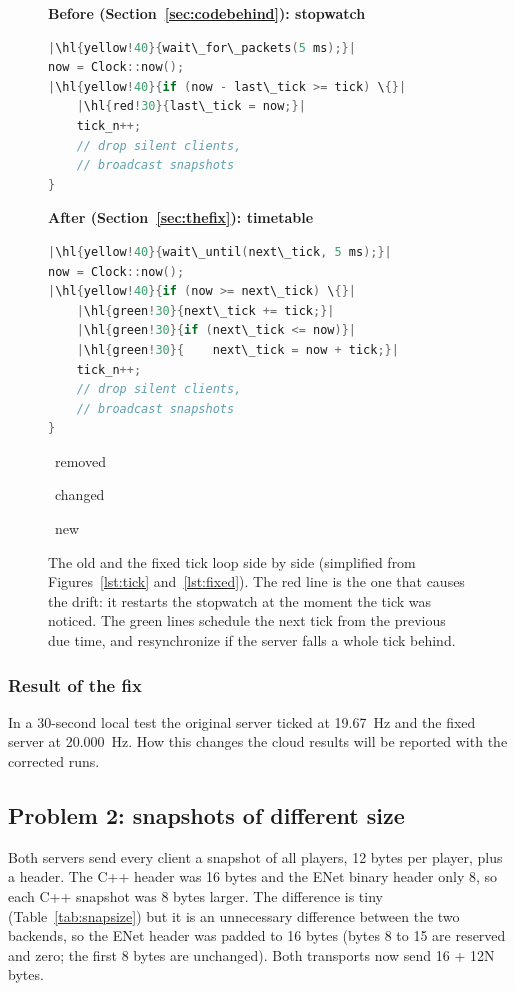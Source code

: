 \newcommand{\hl}[2]{\colorbox{#1}{\strut#2}}
\begin{figure}[H]
\centering
\begin{minipage}[t]{0.48\textwidth}
\textbf{\small Before (Section~\ref{sec:codebehind}): stopwatch}\par\smallskip
\begin{lstlisting}[language=C++,basicstyle=\ttfamily\scriptsize,escapechar=|,frame=none]
|\hl{yellow!40}{wait\_for\_packets(5 ms);}|
now = Clock::now();
|\hl{yellow!40}{if (now - last\_tick >= tick) \{}|
    |\hl{red!30}{last\_tick = now;}|
    tick_n++;
    // drop silent clients,
    // broadcast snapshots
}
\end{lstlisting}
\end{minipage}\hfill
\begin{minipage}[t]{0.48\textwidth}
\textbf{\small After (Section~\ref{sec:thefix}): timetable}\par\smallskip
\begin{lstlisting}[language=C++,basicstyle=\ttfamily\scriptsize,escapechar=|,frame=none]
|\hl{yellow!40}{wait\_until(next\_tick, 5 ms);}|
now = Clock::now();
|\hl{yellow!40}{if (now >= next\_tick) \{}|
    |\hl{green!30}{next\_tick += tick;}|
    |\hl{green!30}{if (next\_tick <= now)}|
    |\hl{green!30}{    next\_tick = now + tick;}|
    tick_n++;
    // drop silent clients,
    // broadcast snapshots
}
\end{lstlisting}
\end{minipage}
\par\smallskip
{\small\colorbox{red!30}{\strut~removed~}\quad\colorbox{yellow!40}{\strut~changed~}\quad\colorbox{green!30}{\strut~new~}}
\caption{The old and the fixed tick loop side by side (simplified from Figures~\ref{lst:tick} and~\ref{lst:fixed}). The red line is the one that causes the drift: it restarts the stopwatch at the moment the tick was noticed. The green lines schedule the next tick from the previous due time, and resynchronize if the server falls a whole tick behind.}
\label{lst:diff}
\end{figure}

\subsubsection{Result of the fix}
In a 30-second local test the original server ticked at 19.67~Hz and the fixed server at 20.000~Hz. How this changes the cloud results will be reported with the corrected runs.

\subsection{Problem 2: snapshots of different size}
Both servers send every client a snapshot of all players, 12 bytes per player, plus a header. The C++ header was 16 bytes and the ENet binary header only 8, so each C++ snapshot was 8 bytes larger. The difference is tiny (Table~\ref{tab:snapsize}) but it is an unnecessary difference between the two backends, so the ENet header was padded to 16 bytes (bytes 8 to 15 are reserved and zero; the first 8 bytes are unchanged). Both transports now send 16 + 12N bytes.

